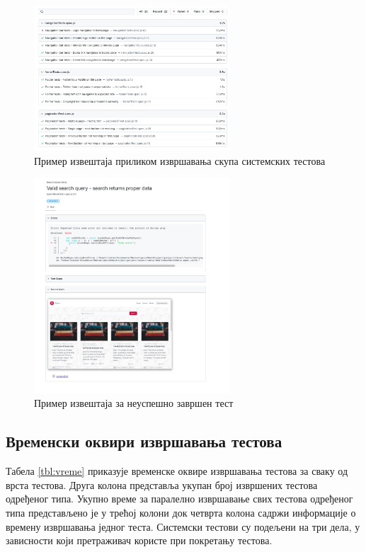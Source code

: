 \documentclass[12pt,oneside]{memoir}
\begin{document}
 \begin{figure}[!ht]
  \centering
  \includegraphics[width=0.65\textwidth]{matfmaster/img/e2e.png}
  \caption{Пример извештаја приликом извршавања скупа системских тестова}
  \label{fig:e2e}
\end{figure}

 \begin{figure}[!ht]
  \centering
  \includegraphics[width=0.65\textwidth]{matfmaster/img/error.png}
  \caption{Пример извештаја за неуспешно завршен тест}
  \label{fig:error}
\end{figure}

\newpage
\newpage


\subsection{Временски оквири извршавања тестова}

Табела \ref{tbl:vreme} приказује временске оквире извршавања тестова за сваку од врста тестова. Друга колона представља укупан број извршених тестова одређеног типа. Укупно време за паралелно извршавање свих тестова одређеног типа представљено је у трећој колони док четврта колона садржи информације о времену извршавања једног теста. Системски тестови су подељени на три дела, у зависности који претраживач користе при покретању тестова.
\end{document}

